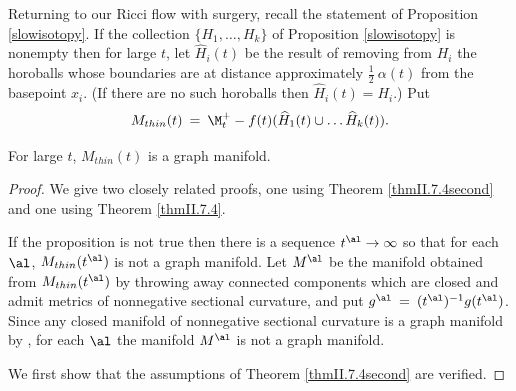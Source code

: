 Returning to our Ricci flow with surgery, recall the statement of
Proposition \ref{slowisotopy}. If the collection
$\{H_1,\ldots, H_k\}$ of Proposition \ref{slowisotopy} is nonempty then
for large $t$, let $\widehat{H}_i(t)$ be the result of removing from $H_i$ the horoballs whose
boundaries are at
distance approximately $\frac12 \: \alpha(t)$ from the basepoint $x_i$.
(If there are no such horoballs then $\widehat{H}_i(t) = H_i$.)
Put
\begin{equation}
M_{thin}(t) \: = \: \M_t^+ - f(t) (\widehat{H}_1(t) \cup \ldots \widehat{H}_k(t)).
\end{equation}

\begin{proposition}
  \label{prop:kl-thin-part-graph-manifold-thick-thin-geometry-proposition}
 \label{thingraph}
For large $t$, $M_{thin}(t)$ is a graph manifold.
\end{proposition}
\begin{proof}
We give two closely related proofs, one using Theorem \ref{thmII.7.4second} and
one using Theorem \ref{thmII.7.4}.


If the proposition is not true then there is a sequence $t^\al \rightarrow \infty$
so that for each $\al$, $M_{thin}(t^\al)$ is not a graph manifold.
Let $M^\al$ be the manifold obtained from  $M_{thin}(t^\al)$
by throwing away connected components which are closed and admit metrics
of nonnegative sectional curvature, and put $g^\al \: = \: (t^\al)^{-1} g(t^\al)$.
Since any closed manifold of nonnegative sectional curvature is a graph
manifold by \cite{Hamiltonnnnn}, for each $\al$ the manifold $M^\al$ is not a graph
manifold.

We first show that the assumptions of Theorem \ref{thmII.7.4second} are verified.

\end{proof}
